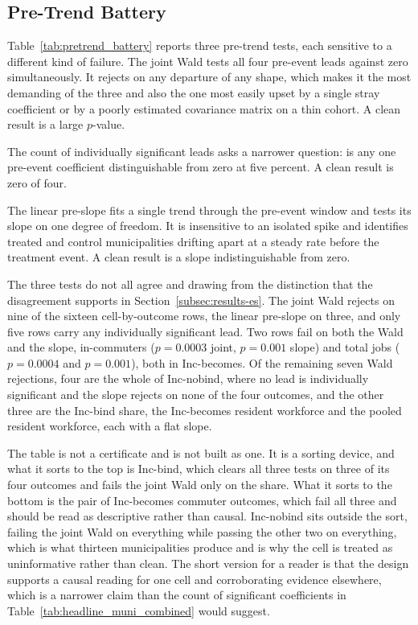 \documentclass[12pt]{article}
\begin{document}
\subsection{Pre-Trend Battery}
\label{subsec:rob-battery}

Table~\ref{tab:pretrend_battery} reports three pre-trend tests, each
sensitive to a different kind of failure. The joint Wald tests all four pre-event leads against zero
simultaneously. It rejects on any departure of any shape, which makes it
the most demanding of the three and also the one most easily upset by a
single stray coefficient or by a poorly estimated covariance matrix on a
thin cohort. A clean result is a large $p$-value.

The count of individually significant leads asks a narrower question: is
any one pre-event coefficient distinguishable from zero at five percent.
A clean result is zero of four.

The linear pre-slope fits a single trend through the pre-event window and
tests its slope on one degree of freedom. It is insensitive to an isolated
spike and identifies treated and control municipalities drifting apart at a steady rate
before the treatment event. A clean result is a slope indistinguishable from
zero.

The three tests do not all agree and drawing from the
distinction that the disagreement supports in Section~\ref{subsec:results-es}. The
joint Wald rejects on nine of the sixteen cell-by-outcome rows, the linear
pre-slope on three, and only five rows carry any individually significant
lead. Two rows fail on both the Wald and the slope, in-commuters
($p = 0.0003$ joint, $p = 0.001$ slope) and total jobs ($p = 0.0004$ and
$p = 0.001$), both in Inc-becomes. Of the remaining seven Wald rejections,
four are the whole of Inc-nobind, where no lead is individually
significant and the slope rejects on none of the four outcomes, and the
other three are the Inc-bind share, the Inc-becomes resident workforce and
the pooled resident workforce, each with a flat slope.

The table is not a certificate and is not built as one. It is a sorting
device, and what it sorts to the top is Inc-bind, which clears all three
tests on three of its four outcomes and fails the joint Wald only on the
share. What it sorts to the bottom is the pair of Inc-becomes commuter
outcomes, which fail all three and should be read as descriptive rather
than causal. Inc-nobind sits outside the sort, failing the joint Wald on
everything while passing the other two on everything, which is what
thirteen municipalities produce and is why the cell is treated as
uninformative rather than clean. The short version for a reader is that
the design supports a causal reading for one cell and corroborating
evidence elsewhere, which is a narrower claim than the count of
significant coefficients in Table~\ref{tab:headline_muni_combined} would
suggest.
\end{document}
